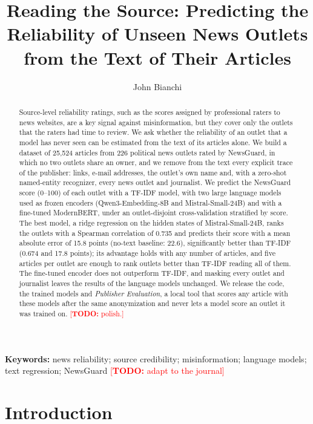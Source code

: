 \documentclass[11pt,a4paper]{article}
\title{Reading the Source: Predicting the Reliability of Unseen News Outlets from the Text of Their Articles
\todo{working title}}
\author{John Bianchi \and \todo{co-authors and affiliations}}
\date{}
\newcommand{\todo}[1]{\textcolor{red}{[\textbf{TODO:} #1]}}
\begin{document}
\maketitle

\begin{abstract}
Source-level reliability ratings, such as the scores assigned by professional raters to news websites, are a key
signal against misinformation, but they cover only the outlets that the raters had time to review. We ask whether the
reliability of an outlet that a model has never seen can be estimated from the text of its articles alone. We build a
dataset of 25,524 articles from 226 political news outlets rated by NewsGuard, in which no two outlets share an owner,
and we remove from the text every explicit trace of the publisher: links, e-mail addresses, the outlet's own name and,
with a zero-shot named-entity recognizer, every news outlet and journalist. We predict the NewsGuard score (0--100) of
each outlet with a TF-IDF model, with two large language models used as frozen encoders (Qwen3-Embedding-8B and
Mistral-Small-24B) and with a fine-tuned ModernBERT, under an outlet-disjoint cross-validation stratified by score.
The best model, a ridge regression on the hidden states of Mistral-Small-24B, ranks the outlets with a Spearman
correlation of 0.735 and predicts their score with a mean absolute error of 15.8 points (no-text baseline: 22.6),
significantly better than TF-IDF (0.674 and 17.8 points); its advantage holds with any number of articles, and five
articles per outlet are enough to rank outlets better than TF-IDF reading all of them. The fine-tuned encoder does not
outperform TF-IDF, and masking every outlet and journalist leaves the results of the language models unchanged.
We release the code, the trained models and \emph{Publisher Evaluation}, a local tool that scores any article with
these models after the same anonymization and never lets a model score an outlet it was trained on.
\todo{polish.}
\end{abstract}

\noindent\textbf{Keywords:} news reliability; source credibility; misinformation; language models; text regression;
NewsGuard \todo{adapt to the journal}

\section{Introduction}\label{sec:intro}
\end{document}
